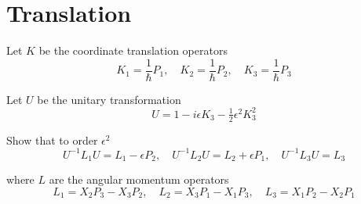 

\section*{Translation}

Let $K$ be the coordinate translation operators
\begin{equation*}
K_1=\frac{1}{\hbar}P_1,\quad K_2=\frac{1}{\hbar}P_2,\quad K_3=\frac{1}{\hbar}P_3
\end{equation*}

Let $U$ be the unitary transformation
\begin{equation*}
U=1-i\epsilon K_3-\tfrac{1}{2}\epsilon^2K_3^2
\end{equation*}

Show that to order $\epsilon^2$
\begin{equation*}
U^{-1}L_1U=L_1-\epsilon P_2,\quad
U^{-1}L_2U=L_2+\epsilon P_1,\quad
U^{-1}L_3U=L_3
\end{equation*}

where $L$ are the angular momentum operators
\begin{equation*}
L_1=X_2P_3-X_3P_2,\quad
L_2=X_3P_1-X_1P_3,\quad
L_3=X_1P_2-X_2P_1
\end{equation*}


